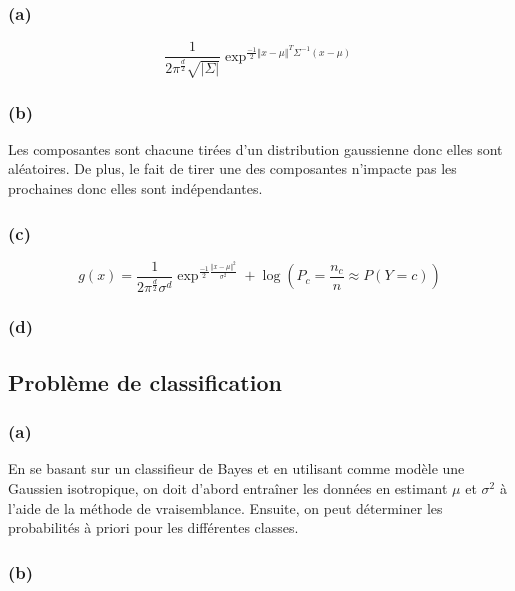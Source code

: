 \documentclass{article}
\begin{document}
	\subsubsection*{(a)}
	\begin{equation}
	\frac{1}{2\pi^{\frac{d}{2}}\sqrt{\vert\Sigma\vert}}\exp^{\frac{-1}{2}\Vert x-\mu\Vert^T{\Sigma^{-1}}(x-\mu)}
	\end{equation}
	\subsubsection*{(b)}
	Les composantes sont chacune tirées d'un distribution gaussienne donc elles sont aléatoires. De plus, le fait de tirer une des composantes n'impacte pas les prochaines donc elles sont indépendantes.
	\subsubsection*{(c)}
	\begin{equation}
	g(x) = \frac{1}{2\pi^{\frac{d}{2}}\sigma^d}\exp^{\frac{-1}{2}\frac{\Vert x-\mu\Vert^2}{\sigma^2}} +\log(P_c = \frac{n_c}{n} \approx P(Y=c))
	\end{equation}
	\subsubsection*{(d)}
	
	
	\subsection{Problème de classification}
		
	\subsubsection*{(a)}
	En se basant sur un classifieur de Bayes et en utilisant comme modèle une Gaussien isotropique, on doit d'abord entraîner les données en estimant $\mu$ et $\sigma^2$ à l'aide de la méthode de vraisemblance.
	Ensuite, on peut déterminer les probabilités à priori pour les différentes classes.
		
	\subsubsection*{(b)}
	
\end{document}
